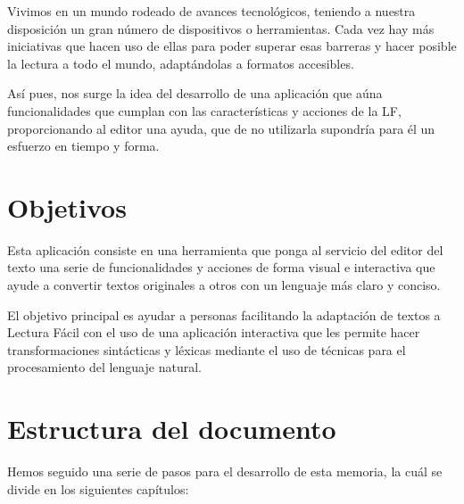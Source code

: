 \setlength{\parskip}{10pt}
Vivimos en un mundo rodeado de avances tecnológicos, teniendo a nuestra disposición un gran número de dispositivos o herramientas. Cada vez hay más iniciativas que hacen uso de ellas para poder superar esas barreras y hacer posible la lectura a todo el mundo, adaptándolas a formatos accesibles. 


\setlength{\parskip}{10pt} 
 
Así pues, nos surge la idea del desarrollo de una aplicación que aúna funcionalidades que cumplan con las características y acciones de la LF, proporcionando al editor una ayuda, que de no utilizarla supondría para él un esfuerzo en tiempo y forma.


\section{Objetivos}
Esta aplicación consiste en una herramienta que ponga al servicio del editor del texto una serie de funcionalidades y acciones de forma visual e interactiva que ayude a convertir textos originales a otros con un lenguaje más claro y conciso.

 \setlength{\parskip}{10pt}
 
El objetivo principal es ayudar a personas facilitando la adaptación de textos a Lectura Fácil con el uso de una aplicación interactiva que les permite hacer transformaciones sintácticas y léxicas mediante el uso de técnicas para el procesamiento del lenguaje natural. 

 

\section{Estructura del documento}


Hemos seguido una serie de pasos para el desarrollo de esta memoria, la cuál se divide en los siguientes capítulos:

